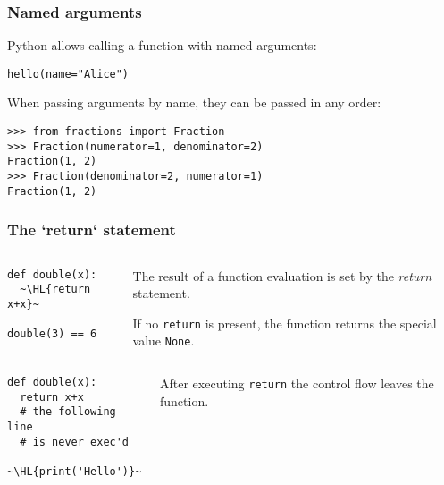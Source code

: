 \documentclass[english,serif,mathserif,xcolor=pdftex,dvipsnames,table]{beamer}
\begin{document}
\begin{frame}[fragile]
  \frametitle{Named arguments}
Python allows calling a function with named arguments:
\begin{lstlisting}
hello(name="Alice")
\end{lstlisting}

\+
When passing arguments by name, they can be passed in any order:
\begin{lstlisting}
>>> from fractions import Fraction
>>> Fraction(numerator=1, denominator=2)
Fraction(1, 2)
>>> Fraction(denominator=2, numerator=1)
Fraction(1, 2)
\end{lstlisting}
\end{frame}

\begin{frame}[fragile]
  \frametitle{The `return` statement}

  \begin{columns}
    \begin{column}{0.5\textwidth}
      \begin{lstlisting}
def double(x):
  ~\HL{return x+x}~

double(3) == 6
      \end{lstlisting}
    \end{column}
    \begin{column}{0.5\textwidth}
      \raggedleft The result of a function evaluation is set by the
      \textit{return} statement.

     \+
      If no \texttt{return} is present, the function returns the
      special value \texttt{None}.

         \end{column}
  \end{columns}
\+
  \begin{columns}
    \begin{column}{0.5\textwidth}
      \begin{lstlisting}
def double(x):
  return x+x
  # the following line
  # is never exec'd
  ~\HL{print('Hello')}~
      \end{lstlisting}
    \end{column}
    \begin{column}{0.5\textwidth}
      \raggedleft After executing \texttt{return} the control flow
      leaves the function.
    \end{column}
  \end{columns}

\end{frame}
\end{document}
